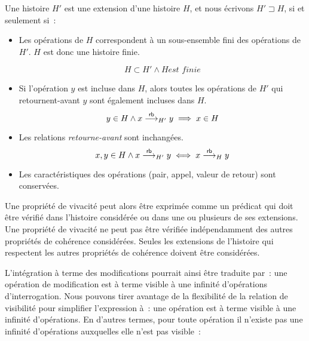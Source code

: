 \begin{definition}\label{def:hist-ext}
Une histoire $H'$ est une extension d'une histoire $H$, et nous écrivons $H' \sqsupset H$, si et seulement si~:
\begin{itemize}
    \item Les opérations de $H$ correspondent à un sous-ensemble fini des opérations de $H'$. $H$ est donc une histoire finie.

    \begin{equation*}
    H \subset H' \land H \textit{est finie}
    \end{equation*}

    \item Si l'opération $y$ est incluse dans $H$, alors toutes les opérations de $H'$ qui retournent-avant $y$ sont également incluses dans $H$.
    \begin{equation*}
    y \in H \land x \overset{\mathsf{rb}}{\longrightarrow}_{H'} y \implies x \in H
    \end{equation*}
    
    \item Les relations \emph{retourne-avant} sont inchangées.
    \begin{equation*}
    x, y \in H \land x \overset{\mathsf{rb}}{\longrightarrow}_{H'} y \iff x \overset{\mathsf{rb}}{\longrightarrow}_{H} y
    \end{equation*}
    
    \item Les caractéristiques des opérations (pair, appel, valeur de retour) sont conservées.
\end{itemize}
\end{definition}

Une propriété de vivacité peut alors être exprimée comme un prédicat qui doit être vérifié dans l'histoire considérée ou dans une ou plusieurs de ses extensions.
Une propriété de vivacité ne peut pas être vérifiée indépendamment des autres propriétés de cohérence considérées.
Seules les extensions de l'histoire qui respectent les autres propriétés de cohérence doivent être considérées.

L'intégration à terme des modifications pourrait ainsi être traduite par~: une opération de modification est à terme visible à une infinité d'opérations d'interrogation.
Nous pouvons tirer avantage de la flexibilité de la relation de visibilité pour simplifier l'expression à~: une opération est à terme visible à une infinité d'opérations.
En d'autres termes, pour toute opération il n'existe pas une infinité d'opérations auxquelles elle n'est pas visible~:

